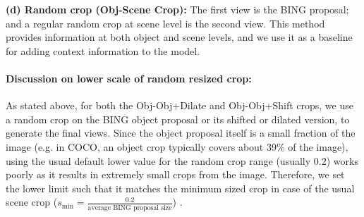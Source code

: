 
\textbf{(d) Random crop (Obj-Scene Crop):} The first view is the BING proposal; and a regular random crop at scene level is the second view. This method provides information at both object and scene levels, and we use it as a baseline for adding context information to the model. 

\paragraph{Discussion on lower scale of random resized crop:}
As stated above, for both the Obj-Obj+Dilate and Obj-Obj+Shift crops, we use a random crop on the BING object proposal or its shifted or dilated version, to generate the final views. Since the object proposal itself is a small fraction of the image (e.g. in COCO, an object crop typically covers about 39\% of the image), using the usual default lower value for the random crop range (usually $0.2$) works poorly as it results in extremely small crops from the image. Therefore, we set the lower limit such that it matches the minimum sized crop in case of the usual scene crop ($s_{\text{min}} = \frac{0.2}{\text{average BING proposal size}}$) . 

